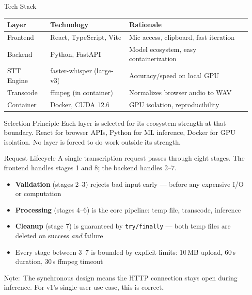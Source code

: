 \documentclass{beamer}
\newcommand{\nt}{$\underline{\text{Note}}:$ }
\begin{document}
\begin{frame}{Tech Stack}
    \begin{table}
    \centering\small
    \begin{tabular}{@{} p{1.5cm} p{3.6cm} p{4.8cm} @{}}
        \toprule
        \textbf{Layer} & \textbf{Technology} & \textbf{Rationale} \\
        \midrule
        Frontend   & React, TypeScript, Vite  & Mic access, clipboard, fast iteration \\
        Backend    & Python, FastAPI           & Model ecosystem, easy containerization \\
        STT Engine & faster-whisper (large-v3) & Accuracy/speed on local GPU \\
        Transcode  & ffmpeg (in container)     & Normalizes browser audio to WAV \\
        Container  & Docker, CUDA 12.6         & GPU isolation, reproducibility \\
        \bottomrule
    \end{tabular}
    \end{table}

    \vspace{0.4em}
    \begin{block}{Selection Principle}
        Each layer is selected for its ecosystem strength at that boundary.
        React for browser APIs, Python for ML inference, Docker for GPU
        isolation. No layer is forced to do work outside its strength.
    \end{block}
\end{frame}


\begin{frame}{Request Lifecycle}
    A single transcription request passes through eight stages.
    The frontend handles stages 1 and 8; the backend handles 2--7.

    \vspace{0.6em}
    \begin{itemize}
        \item \textbf{Validation} (stages 2--3) rejects bad input early ---
              before any expensive I/O or computation
        \item \textbf{Processing} (stages 4--6) is the core pipeline:
              temp file, transcode, inference
        \item \textbf{Cleanup} (stage 7) is guaranteed by \texttt{try/finally}
              --- both temp files are deleted on success \textit{and} failure
        \item Every stage between 3--7 is bounded by explicit limits:
              10\,MB upload, 60\,s duration, 30\,s ffmpeg timeout
    \end{itemize}

    \vspace{0.4em}
    \nt The synchronous design means the HTTP connection stays open
    during inference. For v1's single-user use case, this is correct.
\end{frame}
\end{document}
